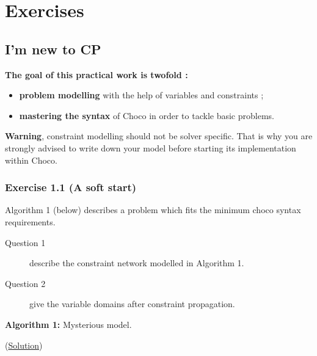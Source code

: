 \label{exercises}
\hypertarget{exercises}{}

\chapter{Exercises}\label{exercises:exercises}\hypertarget{exercises:exercises}{}

\section{I'm new to CP}\label{exercises:i'mnewtocp}\hypertarget{exercises:i'mnewtocp}{}

\begin{note}
\textbf{The goal of this practical work is twofold :}
\begin{itemize}
	\item \textbf{problem modelling} with the help of variables and constraints ;
	\item \textbf{mastering the syntax} of Choco in order to tackle basic problems.
\end{itemize}

\textbf{Warning}, constraint modelling should not be solver specific. That is why you are strongly advised to write down your model before starting its implementation within Choco. %

\end{note}

\subsection{Exercise 1.1 (A soft start)}\label{exercises:exercise1.1}\hypertarget{exercises:exercise1.1}{}

Algorithm 1 (below) describes a problem which fits the minimum choco syntax requirements.
\begin{description}
	\item[Question 1] describe the constraint network modelled in Algorithm 1.
	\item[Question 2] give the variable domains after constraint propagation.
\end{description}
\begin{center}
\textbf{Algorithm 1:} Mysterious model.

\end{center}
(\hyperlink{solutions:solutionofexercise1.1}{Solution})

